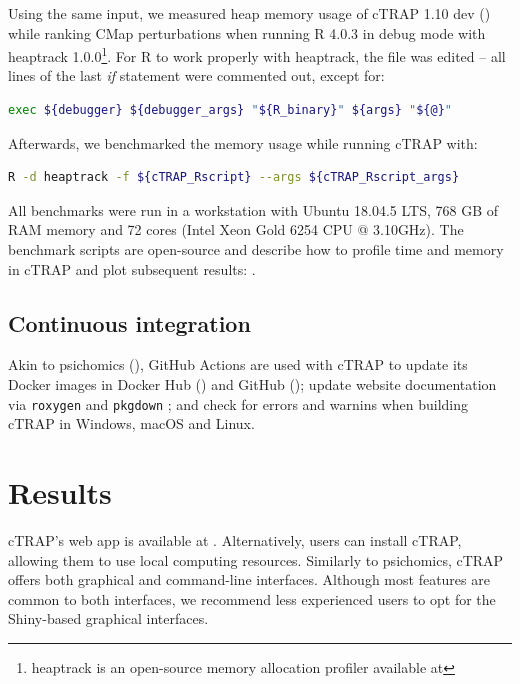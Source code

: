 Using the same input, we measured heap memory usage of cTRAP 1.10 dev () while ranking CMap perturbations when running R 4.0.3 in debug mode with heaptrack 1.0.0\footnote{heaptrack is an open-source memory allocation profiler available at }. For R to work properly with heaptrack, the  file was edited -- all lines of the last \emph{if} statement were commented out, except for:

\begin{lstlisting}[language=bash,numbers=none]
exec ${debugger} ${debugger_args} "${R_binary}" ${args} "${@}"
\end{lstlisting}

Afterwards, we benchmarked the memory usage while running cTRAP with:

\begin{lstlisting}[language=bash,numbers=none]
R -d heaptrack -f ${cTRAP_Rscript} --args ${cTRAP_Rscript_args}
\end{lstlisting}

All benchmarks were run in a workstation with Ubuntu 18.04.5 LTS, 768 GB of RAM memory and 72 cores (Intel Xeon Gold 6254 CPU @ 3.10GHz). The benchmark scripts are open-source and describe how to profile time and memory in cTRAP and plot subsequent results: .

\subsection{Continuous integration}

Akin to psichomics (), GitHub Actions are used with cTRAP to update its Docker images in Docker Hub () and GitHub (); update website documentation via \texttt{roxygen} \cite{wickham:2021wt} and \texttt{pkgdown} \cite{wickham:2021wj}; and check for errors and warnins when building cTRAP in Windows, macOS and Linux.

\section{Results}

cTRAP's web app is available at . Alternatively, users can install cTRAP, allowing them to use local computing resources. Similarly to psichomics, cTRAP offers both graphical and command-line interfaces. Although most features are common to both interfaces, we recommend less experienced users to opt for the Shiny-based graphical interfaces.

